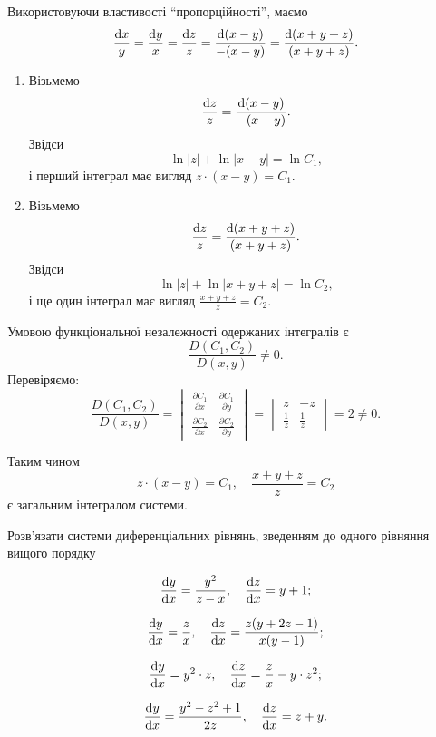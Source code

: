 \begin{solution}
	Використовуючи властивості ``пропорційності'', маємо \[ \frac{\mathop{}\!\mathrm{d} x}{y} = \frac{\mathop{}\!\mathrm{d} y}{x} = \frac{\mathop{}\!\mathrm{d} z}{z} = \frac{\mathop{}\!\mathrm{d} (x - y)}{-(x - y)} = \frac{\mathop{}\!\mathrm{d} (x + y + z)}{(x + y + z)}. \]

	\begin{enumerate}
		\item Візьмемо \[\frac{\mathop{}\!\mathrm{d} z}{z} = \frac{\mathop{}\!\mathrm{d} (x - y)}{-(x - y)}.\] Звідси \[\ln |z| + \ln |x - y| = \ln C_1,\] і перший інтеграл має вигляд $z \cdot (x - y) = C_1$.
		\item Візьмемо \[\frac{\mathop{}\!\mathrm{d} z}{z} = \frac{\mathop{}\!\mathrm{d} (x + y + z)}{(x + y + z)}.\] Звідси \[\ln |z| + \ln |x + y + z| = \ln C_2,\] і ще один інтеграл має вигляд $\frac{x + y + z}{z} = C_2$.
	\end{enumerate}

	Умовою функціональної незалежності одержаних інтегралів є \[\frac{D(C_1, C_2)}{D(x, y)} \ne 0.\] Перевіряємо: \[ \frac{D(C_1, C_2)}{D(x, y)} = \begin{vmatrix} \frac{\partial C_1}{\partial x} & \frac{\partial C_1}{\partial y} \\ \frac{\partial C_2}{\partial x} & \frac{\partial C_2}{\partial y} \end{vmatrix} = \begin{vmatrix} z & -z \\ \frac{1}{z} & \frac{1}{z} \end{vmatrix} = 2 \ne 0. \]
	
	Таким чином \[ z \cdot (x - y) = C_1, \quad \frac{x + y + z}{z} = C_2 \] є загальним інтегралом системи.
\end{solution}

Розв’язати системи диференціальних рівнянь, зведенням до одного рівняння вищого порядку

\begin{multicols}{2}
\begin{problem}
	\[ \frac{\mathop{}\!\mathrm{d} y}{\mathop{}\!\mathrm{d} x} = \frac{y^2}{z - x}, \quad \frac{\mathop{}\!\mathrm{d} z}{\mathop{}\!\mathrm{d} x} = y + 1; \]
\end{problem}
\begin{problem}
	\[ \frac{\mathop{}\!\mathrm{d} y}{\mathop{}\!\mathrm{d} x} = \frac{z}{x}, \quad \frac{\mathop{}\!\mathrm{d} z}{\mathop{}\!\mathrm{d} x} = \frac{z (y + 2 z - 1)}{x (y - 1)}; \]
\end{problem}
\begin{problem}
	\[ \frac{\mathop{}\!\mathrm{d} y}{\mathop{}\!\mathrm{d} x} = y^2 \cdot z, \quad \frac{\mathop{}\!\mathrm{d} z}{\mathop{}\!\mathrm{d} x} = \frac{z}{x} - y \cdot z^2; \]
\end{problem}
\begin{problem}
	\[ \frac{\mathop{}\!\mathrm{d} y}{\mathop{}\!\mathrm{d} x} = \frac{y^2 - z^2 + 1}{2 z}, \quad \frac{\mathop{}\!\mathrm{d} z}{\mathop{}\!\mathrm{d} x} = z + y. \]
\end{problem}
\end{multicols}

